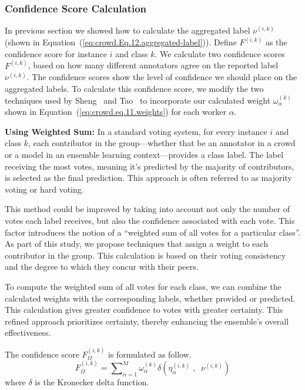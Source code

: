 \subsubsection{Confidence Score Calculation}
In previous section we showed how to calculate the aggregated label $\nu^{(i,k)}$ (shown in Equation~(\ref{eq:crowd.Eq.12.aggregated-label})). Define $F^{(i,k)} $ as the confidence score for instance $i $ and class $k $. We calculate two confidence scores $F^{(i,k)} $, based on how many different annotators agree on the reported label $\nu^{(i,k)}$. The confidence scores show the level of confidence we should place on the aggregated labels. To calculate this confidence score, we modify the two techniques used by Sheng~\cite{sheng_Majority_2019} and Tao~\cite{tao_Label_2020} to incorporate our calculated weight $\omega_{\alpha}^{(k)} $ shown in Equation~(\ref{eq:crowd.eq.11.weights})  for each worker $\alpha $.

\textbf{Using Weighted Sum:}
In a standard voting system, for every instance $i$ and class $k$, each contributor in the group—whether that be an annotator in a crowd or a model in an ensemble learning context—provides a class label. The label receiving the most votes, meaning it's predicted by the majority of contributors, is selected as the final prediction. This approach is often referred to as majority voting or hard voting.

This method could be improved by taking into account not only the number of votes each label receives, but also the confidence associated with each vote. This factor introduces the notion of a ``weighted sum of all votes for a particular class''. As part of this study, we propose techniques that assign a weight to each contributor in the group. This calculation is based on their voting consistency and the degree to which they concur with their peers.

To compute the weighted sum of all votes for each class, we can combine the calculated weights with the corresponding labels, whether provided or predicted. This calculation gives greater confidence to votes with greater certainty. This refined approach prioritizes certainty, thereby enhancing the ensemble's overall effectiveness.

The confidence score $F_{\Omega}^{(i,k)}$ is formulated as follow.
\begin{equation}
    F_{\Omega}^{(i,k)} = {\sum\nolimits_{\alpha=1}^{M}{\omega_{\alpha}^{(k)} \delta\left(\eta_{\alpha}^{(i,k)} \;,\;\; \nu^{(i,k)} \right)}}
    \label{eq:crowd.Eq.13.confidence-score.Freq}
\end{equation}
where $\delta $ is the Kronecker delta function.

